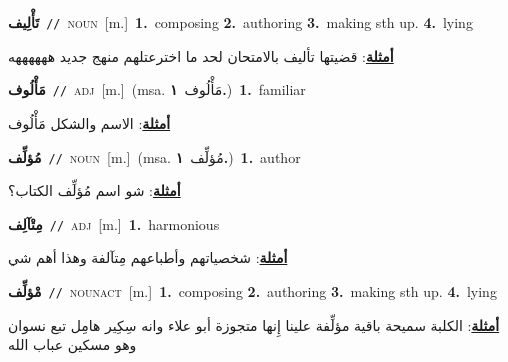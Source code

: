 \documentclass[10pt,a4paper,twoside]{article} %
\begin{document}
\begin{multicols}{2}
{\setlength\topsep{0pt}\textbf{\foreignlanguage{arabic}{تَأْلِيف}}\ {\color{gray}\texttt{//}\color{black}}\ \textsc{noun}\ [m.]\ \textbf{1.}~composing  \textbf{2.}~authoring  \textbf{3.}~making sth up.  \textbf{4.}~lying\  \begin{flushright}\color{gray}\foreignlanguage{arabic}{\textbf{\underline{\foreignlanguage{arabic}{أمثلة}}}: قضيتها تأليف بالامتحان لحد ما اخترعتلهم منهج جديد ههههههه}\end{flushright}\color{black}} \vspace{2mm}

{\setlength\topsep{0pt}\textbf{\foreignlanguage{arabic}{مَأْلُوف}}\ {\color{gray}\texttt{//}\color{black}}\ \textsc{adj}\ [m.]\ \color{gray}(msa. \foreignlanguage{arabic}{مَأْلُوف}~\foreignlanguage{arabic}{\textbf{١.}})\color{black}\ \textbf{1.}~familiar\  \begin{flushright}\color{gray}\foreignlanguage{arabic}{\textbf{\underline{\foreignlanguage{arabic}{أمثلة}}}: الاسم والشكل مَأْلُوف}\end{flushright}\color{black}} \vspace{2mm}

{\setlength\topsep{0pt}\textbf{\foreignlanguage{arabic}{مُؤلِّف}}\ {\color{gray}\texttt{//}\color{black}}\ \textsc{noun}\ [m.]\ \color{gray}(msa. \foreignlanguage{arabic}{مُؤلِّف}~\foreignlanguage{arabic}{\textbf{١.}})\color{black}\ \textbf{1.}~author\  \begin{flushright}\color{gray}\foreignlanguage{arabic}{\textbf{\underline{\foreignlanguage{arabic}{أمثلة}}}: شو اسم مُؤلِّف الكتاب؟}\end{flushright}\color{black}} \vspace{2mm}

{\setlength\topsep{0pt}\textbf{\foreignlanguage{arabic}{مِتْآلِف}}\ {\color{gray}\texttt{//}\color{black}}\ \textsc{adj}\ [m.]\ \textbf{1.}~harmonious\  \begin{flushright}\color{gray}\foreignlanguage{arabic}{\textbf{\underline{\foreignlanguage{arabic}{أمثلة}}}: شخصياتهم وأطباعهم مِتآلفة وهذا أهم شي}\end{flushright}\color{black}} \vspace{2mm}

{\setlength\topsep{0pt}\textbf{\foreignlanguage{arabic}{مْؤلِّف}}\ {\color{gray}\texttt{//}\color{black}}\ \textsc{noun\textunderscore act}\ [m.]\ \textbf{1.}~composing  \textbf{2.}~authoring  \textbf{3.}~making sth up.  \textbf{4.}~lying\  \begin{flushright}\color{gray}\foreignlanguage{arabic}{\textbf{\underline{\foreignlanguage{arabic}{أمثلة}}}: الكلبة سميحة باقية مؤلِّفة علينا إِنها متجوزة أبو علاء وانه سِكِير هامِل تبع نسوان وهو مسكين عباب الله}\end{flushright}\color{black}} \vspace{2mm}


\end{multicols}
\end{document}
